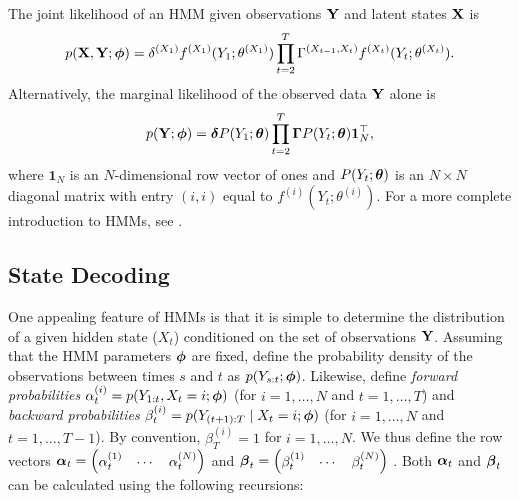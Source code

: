 The joint likelihood of an HMM given observations $\mathbf{Y}$ and latent states $\mathbf{X}$ is
%
\begin{equation}
    p(\mathbf{X},\mathbf{Y};\boldsymbol{\phi}) = \delta^{(X_1)} f^{(X_1)}(Y_1; \theta^{(X_1)}) \prod_{t=2}^T \Gamma^{(X_{t-1},X_t)} f^{(X_t)}(Y_t; \theta^{(X_t)}).
    \label{eqn:like}
\end{equation}
%
Alternatively, the marginal likelihood of the observed data $\mathbf{Y}$ alone is 
%
\begin{equation}
    p(\mathbf{Y};\boldsymbol{\phi}) = \boldsymbol{\delta} P(Y_1;\boldsymbol{\theta}) \prod_{t=2}^T \boldsymbol{\Gamma} P(Y_t;\boldsymbol{\theta}) \mathbf{1}^\top_N,
    \label{eqn:like_marginal}
\end{equation}
%
where $\mathbf{1}_N$ is an $N$-dimensional row vector of ones and $P(Y_t;\boldsymbol{\theta})$ is an $N \times N$ diagonal matrix with entry $(i,i)$ equal to $f^{(i)}(Y_t; \theta^{(i)})$. For a more complete introduction to HMMs, see \citet{Zucchini:2016}.
%
\subsection{State Decoding}
%
%
%
%
%
%
%
%

One appealing feature of HMMs is that it is simple to determine the distribution of a given hidden state ($X_t$) conditioned on the set of observations $\mathbf{Y}$. Assuming that the HMM parameters $\boldsymbol{\phi}$ are fixed, define the probability density of the observations between times $s$ and $t$ as $p(Y_{s:t};\boldsymbol{\phi})$. Likewise, define \textit{forward probabilities} $\alpha^{(i)}_t = p(Y_{1:t},X_t = i;\boldsymbol{\phi})$ (for $i = 1,\ldots,N$ and $t = 1,\ldots,T$) and \textit{backward probabilities} $\beta^{(i)}_t = p(Y_{(t+1):T} \mid X_t = i;\boldsymbol{\phi})$ (for $i = 1,\ldots,N$ and $t = 1,\ldots,T-1$). By convention, $\beta^{(i)}_T = 1$ for $i = 1,\ldots,N$. We thus define the row vectors $\boldsymbol{\alpha}_t = \begin{pmatrix} \alpha_t^{(1)} & \cdots & \alpha_t^{(N)} \end{pmatrix}$ and $\boldsymbol{\beta}_t = \begin{pmatrix} \beta_t^{(1)} & \cdots & \beta_t^{(N)} \end{pmatrix}$ . Both $\boldsymbol{\alpha}_t$ and $\boldsymbol{\beta}_t$ can be calculated using the following recursions: %

